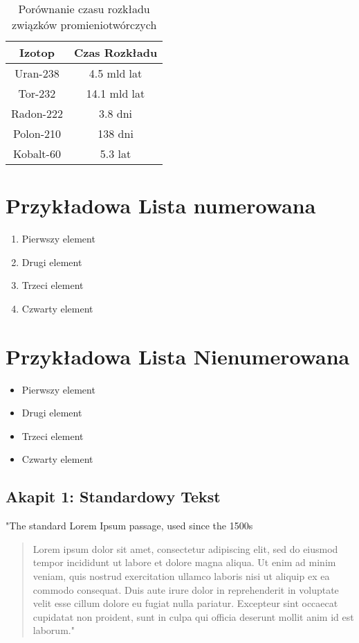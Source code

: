 \begin{table}[hbtp]
    \centering
    \caption{Porównanie czasu rozkładu związków promieniotwórczych}\vspace{0.5ex}
    \begin{tabular}{|| c c ||}
        \hline
        Izotop & Czas Rozkładu \\ [0.5ex]
        \hline\hline
        Uran-238 & 4.5 mld lat \\
        Tor-232 & 14.1 mld lat \\
        Radon-222 & 3.8 dni \\
        Polon-210 & 138 dni \\
        Kobalt-60 & 5.3 lat \\

        \hline
    \end{tabular}
    \label{tab:rozklad-promieniotworczy}
\end{table}
\newpage
\section*{Przykładowa Lista numerowana}
\begin{enumerate}
    \item Pierwszy element
    \item Drugi element
    \item Trzeci element
    \item Czwarty element
\end{enumerate}

\section*{Przykładowa Lista Nienumerowana}

\begin{itemize}
    \item Pierwszy element
    \item Drugi element
    \item Trzeci element
    \item Czwarty element
\end{itemize}


\subsection*{Akapit 1: Standardowy Tekst}

"The standard Lorem Ipsum passage, used since the 1500s
\begin{quote}
    Lorem ipsum dolor sit amet, consectetur adipiscing elit, sed do eiusmod tempor incididunt ut labore et dolore magna aliqua. Ut enim ad minim veniam, quis nostrud exercitation ullamco laboris nisi ut aliquip ex ea commodo consequat. Duis aute irure dolor in reprehenderit in voluptate velit esse cillum dolore eu fugiat nulla pariatur. Excepteur sint occaecat cupidatat non proident, sunt in culpa qui officia deserunt mollit anim id est laborum."
\end{quote}

